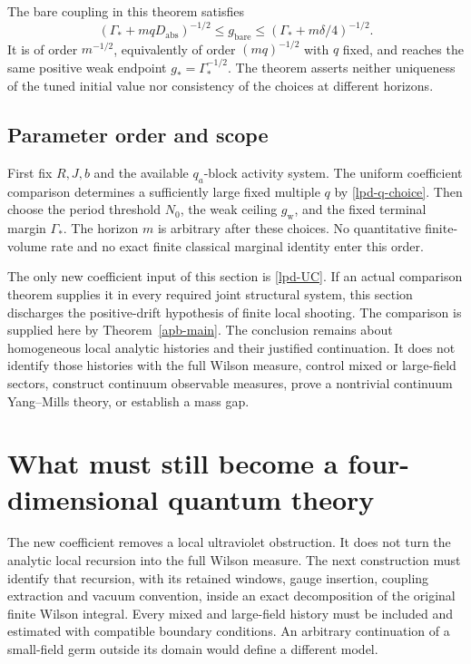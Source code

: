 \documentclass[11pt]{article}
\theoremstyle{remark}
\begin{document}
The bare coupling in this theorem satisfies
\begin{equation}
 (\Gamma_*+mqD_{\mathrm{abs}})^{-1/2}
       \le g_{\mathrm{bare}}
       \le(\Gamma_*+m\delta/4)^{-1/2}.
 \label{lpd-bare-asymptotic}
\end{equation}
It is of order \(m^{-1/2}\), equivalently of order
\((mq)^{-1/2}\) with \(q\) fixed, and reaches the same positive
weak endpoint \(g_*=\Gamma_*^{-1/2}\). The theorem asserts neither
uniqueness of the tuned initial value nor consistency of the
choices at different horizons.

\subsection{Parameter order and scope}
\label{lpd-scope}

First fix \(R,J,b\) and the available \(q_a\)-block activity system.
The uniform coefficient comparison determines a sufficiently large
fixed multiple \(q\) by \eqref{lpd-q-choice}. Then choose the
period threshold \(N_0\), the weak ceiling \(g_{\mathrm w}\), and
the fixed terminal margin \(\Gamma_*\). The horizon \(m\) is
arbitrary after these choices. No quantitative finite-volume rate
and no exact finite classical marginal identity enter this order.

The only new coefficient input of this section is
\eqref{lpd-UC}. If an actual comparison theorem supplies it in
every required joint structural system, this section discharges
the positive-drift hypothesis of finite local shooting. The
comparison is supplied here by Theorem~\ref{apb-main}. The
conclusion remains about homogeneous local analytic histories
and their justified continuation. It does not identify those
histories with the full Wilson measure, control mixed or large-field
sectors, construct continuum observable measures, prove a
nontrivial continuum Yang--Mills theory, or establish a mass gap.


\section{What must still become a four-dimensional quantum theory}
\label{pdh-existence-boundary}

The new coefficient removes a local ultraviolet obstruction. It does
not turn the analytic local recursion into the full Wilson measure.
The next construction must identify that recursion, with its retained
windows, gauge insertion, coupling extraction and vacuum convention,
inside an exact decomposition of the original finite Wilson integral.
Every mixed and large-field history must be included and estimated
with compatible boundary conditions. An arbitrary continuation of a
small-field germ outside its domain would define a different model.
\end{document}
